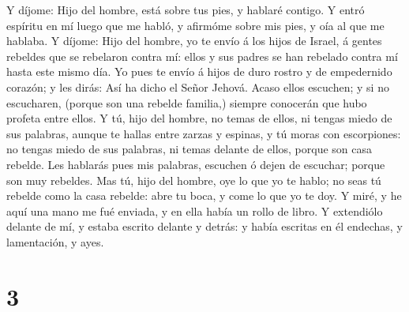  Y díjome: Hijo del hombre, está sobre tus pies, y hablaré
contigo.  Y entró espíritu en mí luego que me habló, y
afirmóme sobre mis pies, y oía al que me hablaba.  Y díjome:
Hijo del hombre, yo te envío á los hijos de Israel, á gentes rebeldes
que se rebelaron contra mí: ellos y sus padres se han rebelado contra mí
hasta este mismo día.  Yo pues te envío á hijos de duro
rostro y de empedernido corazón; y les dirás: Así ha dicho el Señor
Jehová.  Acaso ellos escuchen; y si no escucharen, (porque
son una rebelde familia,) siempre conocerán que hubo profeta entre
ellos.  Y tú, hijo del hombre, no temas de ellos, ni tengas
miedo de sus palabras, aunque te hallas entre zarzas y espinas, y tú
moras con escorpiones: no tengas miedo de sus palabras, ni temas delante
de ellos, porque son casa rebelde.  Les hablarás pues mis
palabras, escuchen ó dejen de escuchar; porque son muy rebeldes.
 Mas tú, hijo del hombre, oye lo que yo te hablo; no seas tú
rebelde como la casa rebelde: abre tu boca, y come lo que yo te doy.
 Y miré, y he aquí una mano me fué enviada, y en ella había
un rollo de libro.  Y extendiólo delante de mí, y estaba
escrito delante y detrás: y había escritas en él endechas, y
lamentación, y ayes.

\hypertarget{section-2}{%
\section{3}\label{section-2}}

